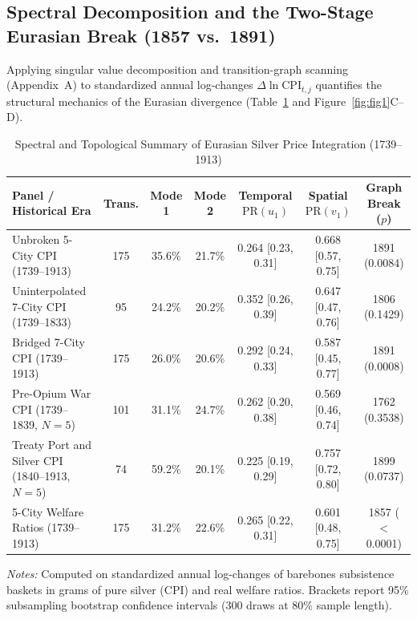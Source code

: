 \documentclass[11pt,a4paper]{article}
\begin{document}
\subsection{Spectral Decomposition and the Two-Stage Eurasian Break (1857 vs.\ 1891)}
Applying singular value decomposition and transition-graph scanning (Appendix~A) to standardized annual log-changes $\Delta \ln \mathrm{CPI}_{t,j}$ quantifies the structural mechanics of the Eurasian divergence (Table~\ref{tab:eurasia_summary} and Figure~\ref{fig:fig1}C--D).
\begin{table}[htbp]
\centering
\caption{Spectral and Topological Summary of Eurasian Silver Price Integration (1739--1913)}
\label{tab:eurasia_summary}
\scriptsize
\setlength{\tabcolsep}{3pt}
\begin{tabular}{@{}p{}cccccc@{}}
\toprule
\textbf{Panel / Historical Era} & \textbf{Trans.} & \textbf{Mode 1} & \textbf{Mode 2} & \textbf{Temporal $\mathrm{PR}(u_1)$} & \textbf{Spatial $\mathrm{PR}(v_1)$} & \textbf{Graph Break ($p$)} \tabularnewline
\midrule
Unbroken 5-City CPI (1739--1913) & 175 & 35.6\% & 21.7\% & 0.264 [0.23, 0.31] & 0.668 [0.57, 0.75] & 1891 (0.0084) \tabularnewline
Uninterpolated 7-City CPI (1739--1833) & 95 & 24.2\% & 20.2\% & 0.352 [0.26, 0.39] & 0.647 [0.47, 0.76] & 1806 (0.1429) \tabularnewline
Bridged 7-City CPI (1739--1913) & 175 & 26.0\% & 20.6\% & 0.292 [0.24, 0.33] & 0.587 [0.45, 0.77] & 1891 (0.0008) \tabularnewline
Pre-Opium War CPI (1739--1839, $N=5$) & 101 & 31.1\% & 24.7\% & 0.262 [0.20, 0.38] & 0.569 [0.46, 0.74] & 1762 (0.3538) \tabularnewline
Treaty Port and Silver CPI (1840--1913, $N=5$) & 74 & 59.2\% & 20.1\% & 0.225 [0.19, 0.29] & 0.757 [0.72, 0.80] & 1899 (0.0737) \tabularnewline
5-City Welfare Ratios (1739--1913) & 175 & 31.2\% & 22.6\% & 0.265 [0.22, 0.31] & 0.601 [0.48, 0.75] & 1857 ($<$0.0001) \tabularnewline
\bottomrule
\end{tabular}
\vspace{1mm}
\begin{minipage}{\textwidth}
\footnotesize\emph{Notes:} Computed on standardized annual log-changes of barebones subsistence baskets in grams of pure silver (CPI) and real welfare ratios. Brackets report 95\% subsampling bootstrap confidence intervals (300 draws at 80\% sample length).
\end{minipage}
\end{table}
\end{document}
